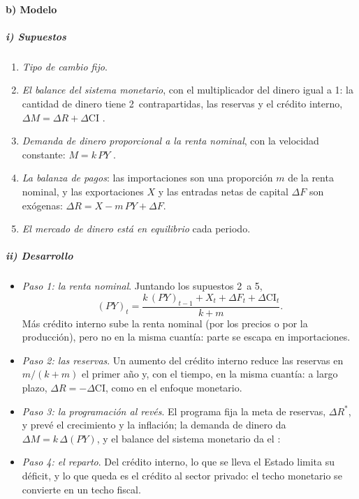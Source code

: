 \documentclass[11pt]{article}
\begin{document}
\paragraph{b) Modelo}

\subparagraph{i) Supuestos}

\begin{enumerate}
\item \emph{Tipo de cambio fijo}.
\item \emph{El balance del sistema monetario}, con el multiplicador del dinero igual a 1: la cantidad de dinero tiene 2~contrapartidas, las reservas y el crédito interno, $\Delta M=\Delta R+\Delta\mathrm{CI}$ .
\item \emph{Demanda de dinero proporcional a la renta nominal}, con la velocidad constante: $M=k\,PY$ .
\item \emph{La balanza de pagos}: las importaciones son una proporción $m$ de la renta nominal, y las exportaciones $X$ y las entradas netas de capital $\Delta F$ son exógenas: $\Delta R=X-m\,PY+\Delta F$.
\item \emph{El mercado de dinero está en equilibrio} cada periodo.
\end{enumerate}

\subparagraph{ii) Desarrollo}

\begin{itemize}
\item \emph{Paso 1: la renta nominal}. Juntando los supuestos 2~a 5,
  \begin{equation}\label{eq:polak-renta}
  (PY)_t=\frac{k\,(PY)_{t-1}+X_t+\Delta F_t+\Delta\mathrm{CI}_t}{k+m} .
  \end{equation}
  Más crédito interno sube la renta nominal (por los precios o por la producción), pero no en la misma cuantía: parte se escapa en importaciones.
\item \emph{Paso 2: las reservas}. Un aumento del crédito interno reduce las reservas en $m/(k+m)$ el primer año y, con el tiempo, en la misma cuantía: a largo plazo, $\Delta R=-\Delta\mathrm{CI}$, como en el enfoque monetario.
\item \emph{Paso 3: la programación al revés}. El programa fija la meta de reservas, $\Delta R^*$, y prevé el crecimiento y la inflación; la demanda de dinero da $\Delta M=k\,\Delta(PY)$, y el balance del sistema monetario da el :
\item \emph{Paso 4: el reparto}. Del crédito interno, lo que se lleva el Estado limita su déficit, y lo que queda es el crédito al sector privado: el techo monetario se convierte en un techo fiscal.
\end{itemize}
\end{document}
